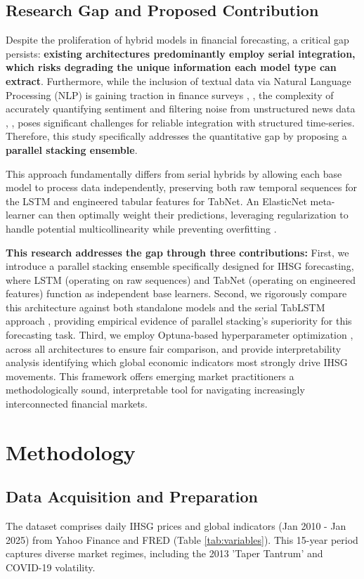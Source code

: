 \documentclass[conference]{IEEEtran}
\begin{document}
\subsection{Research Gap and Proposed Contribution}
Despite the proliferation of hybrid models in financial forecasting, a critical gap persists: \textbf{existing architectures predominantly employ serial integration, which risks degrading the unique information each model type can extract}. Furthermore, while the inclusion of textual data via Natural Language Processing (NLP) is gaining traction in finance surveys \cite{b9}, \cite{b18}, the complexity of accurately quantifying sentiment and filtering noise from unstructured news data \cite{b19}, \cite{b24}, \cite{b25} poses significant challenges for reliable integration with structured time-series. Therefore, this study specifically addresses the quantitative gap by proposing a \textbf{parallel stacking ensemble}.

This approach fundamentally differs from serial hybrids by allowing each base model to process data independently, preserving both raw temporal sequences for the LSTM and engineered tabular features for TabNet. An ElasticNet meta-learner can then optimally weight their predictions, leveraging regularization to handle potential multicollinearity while preventing overfitting \cite{b4}.

\textbf{This research addresses the gap through three contributions:} First, we introduce a parallel stacking ensemble specifically designed for IHSG forecasting, where LSTM (operating on raw sequences) and TabNet (operating on engineered features) function as independent base learners. Second, we rigorously compare this architecture against both standalone models and the serial TabLSTM approach \cite{b8}, providing empirical evidence of parallel stacking's superiority for this forecasting task. Third, we employ Optuna-based hyperparameter optimization \cite{b16}, \cite{b22} across all architectures to ensure fair comparison, and provide interpretability analysis identifying which global economic indicators most strongly drive IHSG movements. This framework offers emerging market practitioners a methodologically sound, interpretable tool for navigating increasingly interconnected financial markets.

\section{Methodology}

\subsection{Data Acquisition and Preparation}
The dataset comprises daily IHSG prices and global indicators (Jan 2010 - Jan 2025) from Yahoo Finance and FRED (Table \ref{tab:variables}). This 15-year period captures diverse market regimes, including the 2013 'Taper Tantrum' and COVID-19 volatility.
\end{document}
